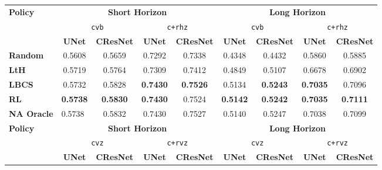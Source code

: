 \begin{tabular}{lcccc|cccc}
\toprule
\multirow{3}{*}{\textbf{Policy}} & \multicolumn{4}{c|}{\textbf{Short Horizon}} & \multicolumn{4}{c}{\textbf{Long Horizon}} \\
\cmidrule(l){2-5}\cmidrule(l){6-9}
 & \multicolumn{2}{c}{\texttt{cvb}} & \multicolumn{2}{c|}{\texttt{c+rhz}} & \multicolumn{2}{c}{\texttt{cvb}} & \multicolumn{2}{c}{\texttt{c+rhz}} \\
  \cmidrule(l){2-3}\cmidrule(l){4-5}\cmidrule(l){6-7}\cmidrule(l){8-9}
 & \multicolumn{1}{c}{\textbf{UNet}} & \multicolumn{1}{c}{\textbf{CResNet}} & \multicolumn{1}{c}{\textbf{UNet}} & \multicolumn{1}{c|}{\textbf{CResNet}} & \multicolumn{1}{c}{\textbf{UNet}} & \multicolumn{1}{c}{\textbf{CResNet}} & \multicolumn{1}{c}{\textbf{UNet}} & \multicolumn{1}{c}{\textbf{CResNet}} \\
\midrule
\textbf{Random}    & {0.5608}            & {0.5659}  & {0.7292} & {0.7338}  &  0.4348 & 0.4432&0.5860& 0.5885\\
\textbf{LtH}         & {0.5719}            & 0.5764         & 0.7309      & 0.7412   & 0.4849   & 0.5107&0.6678 &0.6902      \\
\textbf{LBCS}        &{0.5732}            & 0.5828           & \textbf{0.7430} & \textbf{0.7526} & 0.5134& \textbf{0.5243}&\textbf{0.7035} &0.7096 \\
\textbf{RL }         & \textbf{0.5738}            & \textbf{0.5830}   & \textbf{0.7430} & 0.7524 &\textbf{0.5142} & \textbf{0.5242} &\textbf{0.7035}&\textbf{0.7111} \\
\midrule
\textbf{NA Oracle}          & \multicolumn{1}{l}{0.5738} & {0.5832}  & 0.7430          & 0.7527& 0.5140& 0.5247  & 0.7038 &0.7099\\[2mm]
\bottomrule
\toprule
\multirow{3}{*}{\textbf{Policy}} & \multicolumn{4}{c|}{\textbf{Short Horizon}} & \multicolumn{4}{c}{\textbf{Long Horizon}} \\
\cmidrule(l){2-5}\cmidrule(l){6-9}
 & \multicolumn{2}{c}{\texttt{cvz}} & \multicolumn{2}{c|}{\texttt{c+rvz}} & \multicolumn{2}{c}{\texttt{cvz}} & \multicolumn{2}{c}{\texttt{c+rvz}} \\
 \cmidrule(l){2-3}\cmidrule(l){4-5}\cmidrule(l){6-7}\cmidrule(l){8-9}
 & \multicolumn{1}{c}{\textbf{UNet}} & \multicolumn{1}{c}{\textbf{CResNet}} & \multicolumn{1}{c}{\textbf{UNet}} & \multicolumn{1}{c|}{\textbf{CResNet}} & \multicolumn{1}{c}{\textbf{UNet}} & \multicolumn{1}{c}{\textbf{CResNet}} & \multicolumn{1}{c}{\textbf{UNet}} & \multicolumn{1}{c}{\textbf{CResNet}} \\

\end{tabular}
